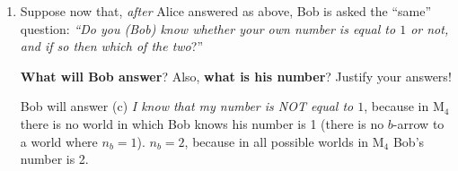 \documentclass[leqno]{article}
\begin{document}
\begin{enumerate}
    \item Suppose now that, \textit{after} Alice answered as above, Bob is asked the ``same'' question: \textit{``Do you (Bob) know whether your own number is equal to $1$ or not, and if so then which of the two}?''
    
    \textbf{What will Bob answer}? Also, \textbf{what is his number}? Justify your answers!
    
    Bob will answer (c) \textit{I know that my number is NOT equal to $1$}, because in M$_4$ there is no world in which Bob knows his number is 1 (there is no $b$-arrow to a world where $n_b=1$). $n_b = 2$, because in all possible worlds in M$_4$ Bob's number is 2.

\end{enumerate}
\end{document}
